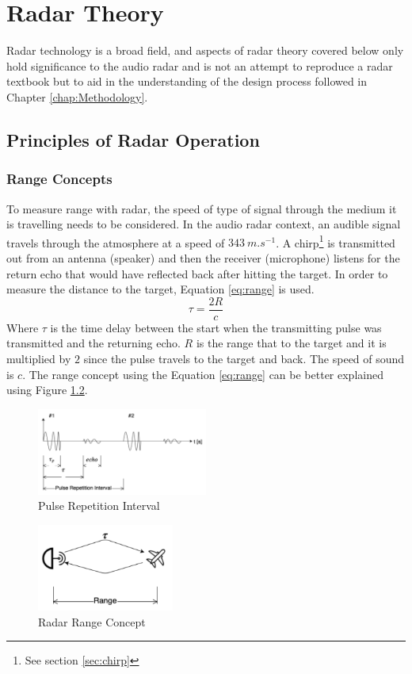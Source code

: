 \chapter{Radar Theory}\label{chap:Radar Theory}
Radar technology is a broad field,  and aspects of radar theory covered below only hold significance to the audio radar and is not an attempt to reproduce a radar textbook but to aid in the understanding of the design process followed in Chapter \ref{chap:Methodology}.
\section{Principles of Radar Operation}
\subsection{Range Concepts}
To measure range with radar, the speed of type of signal through the medium it is travelling needs to be considered. In the audio radar context, an audible signal travels through the atmosphere at a speed of $343\ m.s^{-1}$. A chirp\footnote{See section \ref{sec:chirp}} is transmitted out from an antenna (speaker) and then the receiver (microphone) listens for the return echo that would have reflected back after hitting the target. In order to measure the distance to the target, Equation \ref{eq:range} is used.
\begin{equation}
\tau = \frac{2R}{c}\label{eq:range}
\end{equation}
Where $\tau$ is the time delay between the start when the transmitting pulse was transmitted and the returning echo. $R$ is the range that to the target and it is multiplied by $2$ since the pulse travels to the target and back. The speed of sound is $c$. The range concept using the Equation \ref{eq:range} can be better explained using Figure \ref{fig:rangeConcept}.
\begin{figure}[h!]
    \centering
    \includegraphics[width = 0.5\textwidth]{images/PRI.pdf}
    \caption{Pulse Repetition Interval\cite{richards_principles_2010}}\label{fig:PRI}
\end{figure}
\begin{figure}[h!]
    \centering
    \includegraphics[width = 0.4\textwidth]{images/rangeConcept.pdf}
    \caption{Radar Range Concept \cite{richards_principles_2010}}\label{fig:rangeConcept}
\end{figure}

